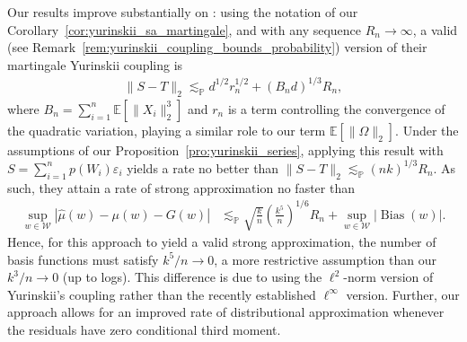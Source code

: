 \documentclass[11pt,lof]{puthesis}
\renewcommand{\P}{\ensuremath{\mathbb{P}}}
\newcommand{\E}{\ensuremath{\mathbb{E}}}
\newcommand{\cW}{\ensuremath{\mathcal{W}}}
\DeclareMathOperator{\Bias}{Bias}
\theoremstyle{break}
\theoremstyle{proof}
\begin{document}
Our results improve substantially on \citet[Theorem~1]{li2020uniform}: using
the notation of our Corollary~\ref{cor:yurinskii_sa_martingale}, and with any
sequence
$R_n \to \infty$, a valid (see
Remark~\ref{rem:yurinskii_coupling_bounds_probability})
version of their martingale Yurinskii coupling is
%
\begin{align*}
\|S-T\|_2
\lesssim_\P
d^{1/2} r^{1/2}_n
+ (B_n d)^{1/3} R_n,
\end{align*}
%
where $B_n = \sum_{i=1}^n \E[\|X_i\|_2^3]$ and $r_n$ is a term controlling the
convergence of the quadratic variation, playing a similar role to our
term $\E[\|\Omega\|_2]$. Under the assumptions of our
Proposition~\ref{pro:yurinskii_series}, applying this
result with $S = \sum_{i=1}^n p(W_i) \varepsilon_i$ yields a rate no better
than $\|S-T\|_2 \lesssim_\P (n k)^{1/3} R_n$. As such, they attain a rate of
strong approximation no faster than
%
\begin{align*}
\sup_{w \in \cW}
\left| \hat\mu(w) - \mu(w) - G(w) \right|
&\lesssim_\P
\sqrt{\frac{k}{n}}
\left( \frac{k^5}{n} \right)^{1/6} R_n
+ \sup_{w \in \cW} |\Bias(w)|.
\end{align*}
%
Hence, for this approach to yield a valid strong approximation, the number of
basis functions must satisfy $k^5/n \to 0$, a more restrictive assumption than
our $k^3 / n \to 0$ (up to logs). This difference is due to
\citet{li2020uniform} using the $\ell^2$-norm version of Yurinskii's coupling
rather than the recently established $\ell^\infty$ version. Further,
our approach allows for an improved rate of distributional approximation
whenever the residuals have zero conditional third moment.
\end{document}

